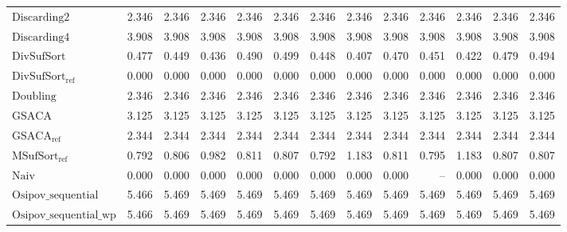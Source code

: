 \begin{table}[h]
{\begin{tabular}{lrrrrrrrrrrrr}
    $\text{Discarding2}$ & 2.346 & 2.346 & 2.346 & 2.346 & 2.346 & 2.346 & 2.346 & 2.346 & 2.346 & 2.346 & 2.346 & 2.346 \\
    $\text{Discarding4}$ & {\color{red}3.908} & {\color{red}3.908} & {\color{red}3.908} & {\color{red}3.908} & {\color{red}3.908} & {\color{red}3.908} & {\color{red}3.908} & {\color{red}3.908} & {\color{red}3.908} & {\color{red}3.908} & {\color{red}3.908} & {\color{red}3.908} \\
    $\text{DivSufSort}$ & 0.477 & 0.449 & 0.436 & 0.490 & 0.499 & 0.448 & 0.407 & 0.470 & 0.451 & 0.422 & 0.479 & 0.494 \\
    $\text{DivSufSort}_{\text{ref}}$ & {\color{green!60!black}0.000} & 0.000 & 0.000 & {\color{green!60!black}0.000} & {\color{green!60!black}0.000} & {\color{green!60!black}0.000} & {\color{green!60!black}0.000} & {\color{green!60!black}0.000} & {\color{green!60!black}0.000} & {\color{green!60!black}0.000} & {\color{green!60!black}0.000} & {\color{green!60!black}0.000} \\
    $\text{Doubling}$ & 2.346 & 2.346 & 2.346 & 2.346 & 2.346 & 2.346 & 2.346 & 2.346 & 2.346 & 2.346 & 2.346 & 2.346 \\
    $\text{GSACA}$ & 3.125 & 3.125 & 3.125 & 3.125 & 3.125 & 3.125 & 3.125 & 3.125 & 3.125 & 3.125 & 3.125 & 3.125 \\
    $\text{GSACA}_{\text{ref}}$ & 2.344 & 2.344 & 2.344 & 2.344 & 2.344 & 2.344 & 2.344 & 2.344 & 2.344 & 2.344 & 2.344 & 2.344 \\
    $\text{MSufSort}_{\text{ref}}$ & 0.792 & 0.806 & 0.982 & 0.811 & 0.807 & 0.792 & 1.183 & 0.811 & 0.795 & 1.183 & 0.807 & 0.807 \\
    $\text{Naiv}$ & {\color{green!60!black}0.000} & {\color{green!60!black}0.000} & {\color{green!60!black}0.000} & {\color{green!60!black}0.000} & {\color{green!60!black}0.000} & {\color{green!60!black}0.000} & {\color{green!60!black}0.000} & {\color{green!60!black}0.000} & {\color{darkgray}--} & {\color{green!60!black}0.000} & {\color{green!60!black}0.000} & {\color{green!60!black}0.000} \\
    $\text{Osipov\_sequential}$ & {\color{red}5.466} & {\color{red}5.469} & {\color{red}5.469} & {\color{red}5.469} & {\color{red}5.469} & {\color{red}5.469} & {\color{red}5.469} & {\color{red}5.469} & {\color{red}5.469} & {\color{red}5.469} & {\color{red}5.469} & {\color{red}5.469} \\
    $\text{Osipov\_sequential\_wp}$ & {\color{red}5.466} & {\color{red}5.469} & {\color{red}5.469} & {\color{red}5.469} & {\color{red}5.469} & {\color{red}5.469} & {\color{red}5.469} & {\color{red}5.469} & {\color{red}5.469} & {\color{red}5.469} & {\color{red}5.469} & {\color{red}5.469} \\

\end{tabular}}
\end{table}
